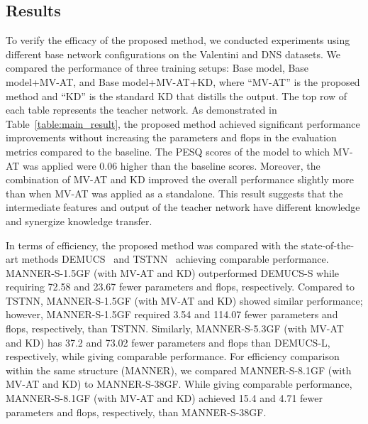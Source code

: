 \documentclass[a4paper]{article}
\begin{document}
\subsection{Results}
To verify the efficacy of the proposed method, we conducted experiments using different base network configurations on the Valentini and DNS datasets. We compared the performance of three training setups: Base model, Base model+MV-AT, and Base model+MV-AT+KD, where ``MV-AT'' is the proposed method and ``KD'' is the standard KD \cite{hinton2015distilling} that distills the output. The top row of each table represents the teacher network. As demonstrated in Table~\ref{table:main_result}, the proposed method achieved significant performance improvements without increasing the parameters and flops in the evaluation metrics compared to the baseline. The PESQ scores of the model to which MV-AT was applied were 0.06 higher than the baseline scores. Moreover, the combination of MV-AT and KD improved the overall performance slightly more than when MV-AT was applied as a standalone. This result suggests that the intermediate features and output of the teacher network have different knowledge and synergize knowledge transfer.

In terms of efficiency, the proposed method was compared with the state-of-the-art methods DEMUCS~\cite{defossez2020real} and TSTNN~\cite{wang2021tstnn} achieving comparable performance. MANNER-S-1.5GF (with MV-AT and KD) outperformed DEMUCS-S while requiring 72.58 and 23.67 fewer parameters and flops, respectively. Compared to TSTNN, MANNER-S-1.5GF (with MV-AT and KD) showed similar performance; however, MANNER-S-1.5GF required 3.54 and 114.07 fewer parameters and flops, respectively, than TSTNN. Similarly, MANNER-S-5.3GF (with MV-AT and KD) has 37.2 and 73.02 fewer parameters and flops than DEMUCS-L, respectively, while giving comparable performance. For efficiency comparison within the same structure (MANNER), we compared MANNER-S-8.1GF (with MV-AT and KD) to MANNER-S-38GF. While giving comparable performance, MANNER-S-8.1GF (with MV-AT and KD) achieved 15.4 and 4.71 fewer parameters and flops, respectively, than MANNER-S-38GF.
\end{document}
